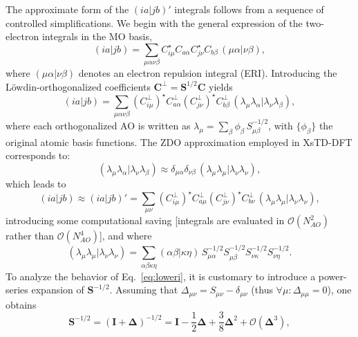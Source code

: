\documentclass[%
 aip,
 amsmath,amssymb,
preprint,%
]{revtex4-2}
\begin{document}
The approximate form of the $(ia|jb)'$ integrals follows from a sequence of controlled simplifications.  
We begin with the general expression of the two-electron integrals in the MO basis,
\begin{equation*}
	(ia|jb) = \sum_{\mu\alpha\nu\beta} C_{i\mu}^\star C_{a\alpha} C^\star_{j\nu} C_{b\beta}\,(\mu\alpha|\nu\beta),
\end{equation*}
where $(\mu\alpha|\nu\beta)$ denotes an electron repulsion integral (ERI).  
Introducing the Löwdin-orthogonalized coefficients $\mathbf{C}^\perp = \mathbf{S}^{1/2}\mathbf{C}$ yields
\begin{equation*}
	(ia|jb) = \sum_{\mu\alpha\nu\beta}( C_{i\mu}^\perp)^\star C_{a\alpha}^\perp (C^\perp_{j\nu})^\star C_{b\beta}^\perp\,(\lambda_\mu\lambda_\alpha|\lambda_\nu\lambda_\beta),
\end{equation*}
where each orthogonalized AO is written as $\lambda_\mu = \sum_\beta \phi_\beta\,S_{\mu\beta}^{-1/2}$, with $\{\phi_\beta\}$ the original atomic basis functions.  
The ZDO approximation employed in XsTD-DFT corresponds to:
\begin{equation}
	(\lambda_\mu\lambda_\alpha|\lambda_\nu\lambda_\beta) \approx \delta_{\mu\alpha}\delta_{\nu\beta}\,(\lambda_\mu\lambda_\mu|\lambda_\nu\lambda_\nu), \label{eq:cndo}
\end{equation}
which leads to
\begin{equation*}
	(ia|jb) \approx (ia|jb)' = \sum_{\mu\nu}( C_{i\mu}^\perp)^\star C_{a\mu}^\perp (C^\perp_{j\nu})^\star C_{b\nu}^\perp\,(\lambda_\mu\lambda_\mu|\lambda_\nu\lambda_\nu),
\end{equation*}
introducing some computational saving [integrals are evaluated in $\mathcal{O}(N_{AO}^2)$ rather than $\mathcal{O}(N_{AO}^4)$], and where
\begin{equation}
	(\lambda_\mu\lambda_\mu|\lambda_\nu\lambda_\nu)
	= \sum_{\alpha\beta\kappa\eta} (\alpha\beta|\kappa\eta)\,
	S^{-1/2}_{\mu\alpha}S^{-1/2}_{\mu\beta}S^{-1/2}_{\nu\kappa}S^{-1/2}_{\nu\eta}.
	\label{eq:loweri}
\end{equation}
To analyze the behavior of Eq.~\eqref{eq:loweri}, it is customary\cite{fischer-hjalmarsZeroDifferentialOverlap1966,grayJustifiabilityZDOApproximation1970,chandlerReexaminationJustificationNeglect1980} to introduce a power-series expansion of $\mathbf S^{-1/2}$.  
Assuming that $\Delta_{\mu\nu} = S_{\mu\nu} -\delta_{\mu\nu}$ (thus $\forall\mu: \Delta_{\mu\mu} = 0$), one obtains
\begin{equation}
	\mathbf S^{-1/2} = (\mathbf I + \bm\Delta)^{-1/2} = \mathbf I - \frac{1}{2}\bm\Delta + \frac{3}{8}\bm\Delta^2 + \mathcal{O}(\bm\Delta^3),
	\label{eq:pows1/2}
\end{equation}
\end{document}
